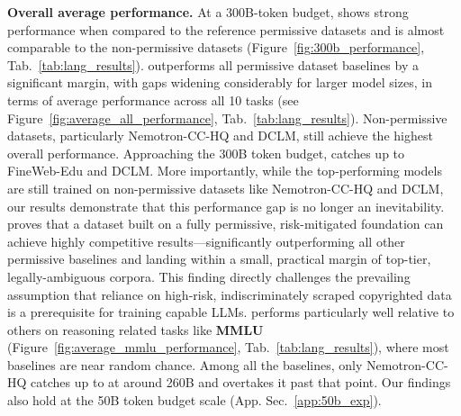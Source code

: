 \textbf{Overall average performance.} At a 300B-token budget, \MixtureVitae{} shows strong performance when compared to the reference permissive datasets and is almost comparable to the non-permissive datasets (Figure~\ref{fig:300b_performance}, Tab.~\ref{tab:lang_results}). \MixtureVitae{} outperforms all permissive dataset baselines by a significant margin, with gaps widening considerably for larger model sizes, in terms of average performance across all 10 tasks (see Figure~\ref{fig:average_all_performance}, Tab.~\ref{tab:lang_results}). Non-permissive datasets, particularly Nemotron-CC-HQ and DCLM, still achieve the highest overall performance. Approaching the 300B token budget, \MixtureVitae{} catches up to FineWeb-Edu and DCLM. More importantly, while the top-performing models are still trained on non-permissive datasets like Nemotron-CC-HQ and DCLM, our results demonstrate that this performance gap is no longer an inevitability. \MixtureVitae{} proves that a dataset built on a fully permissive, risk-mitigated foundation can achieve highly competitive results—significantly outperforming all other permissive baselines and landing within a small, practical margin of top-tier, legally-ambiguous corpora. This finding directly challenges the prevailing assumption that reliance on high-risk, indiscriminately scraped copyrighted data is a prerequisite for training capable LLMs. \MixtureVitae{} performs particularly well relative to others on reasoning related tasks like \textbf{MMLU} (Figure~\ref{fig:average_mmlu_performance}, Tab.~\ref{tab:lang_results}), where most baselines are near random chance. Among all the baselines, only Nemotron-CC-HQ catches up to \MixtureVitae{} at around 260B and overtakes it past that point. Our findings also hold at the 50B token budget scale (App. Sec.~\ref{app:50b_exp}).


